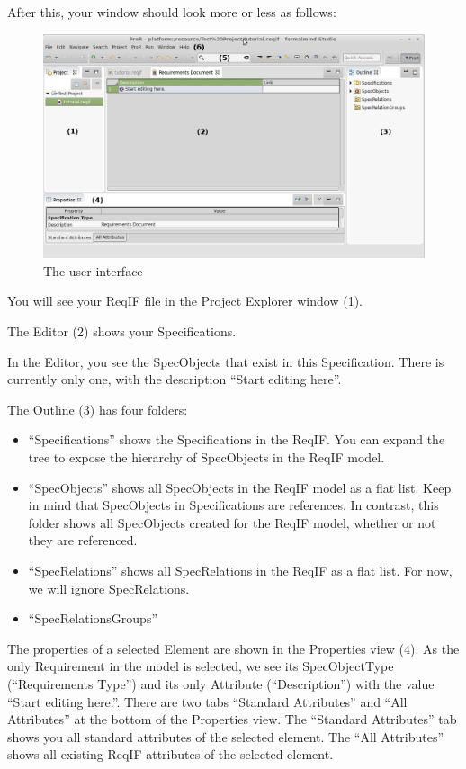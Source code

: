 After this, your window should look more or less as follows:

\begin{figure}[h!]
  \centering
  \includegraphics[width=\linewidth]{../rmf-images/Screenshot_intro.png}
  \caption{The \pror{} user interface}
  \label{fig:user_interface_overview}
\end{figure}

You will see your ReqIF file in the Project Explorer window (1).

The Editor (2) shows your Specifications.

In the Editor, you see the SpecObjects that exist in this Specification.  There is currently only one, with the description ``Start editing here''.

The Outline (3) has four folders:

\begin{itemize}

\item
  ``Specifications'' shows the Specifications in the ReqIF.  You can expand the tree to expose the hierarchy of SpecObjects in the ReqIF model.
\item
  ``SpecObjects'' shows all SpecObjects in the ReqIF model as a flat list.  Keep in mind that SpecObjects in Specifications are references.  In contrast, this folder shows all SpecObjects created for the ReqIF model, whether or not they are referenced.
\item
  ``SpecRelations'' shows all SpecRelations in the ReqIF as a flat list.  For now, we will ignore SpecRelations.
\item
  ``SpecRelationsGroups'' 
\end{itemize}

The properties of a selected Element are shown in the Properties view (4).  As the only Requirement in the model is selected, we see its SpecObjectType (``Requirements Type'') and its only Attribute (``Description'') with the value ``Start editing here.''.  There are two tabs ``Standard Attributes'' and ``All Attributes'' at the bottom of the Properties view.  \marginpar{*****} The ``Standard Attributes'' tab shows you all standard attributes of the selected element.  The ``All Attributes'' shows all existing ReqIF attributes of the selected element.


